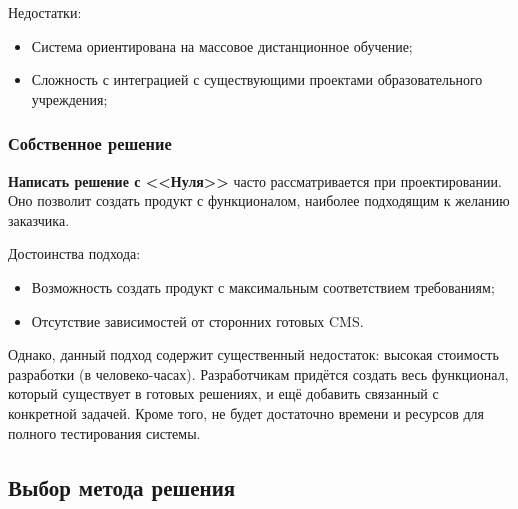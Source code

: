 \documentclass[a4paper,14pt]{article}
\begin{document}
Недостатки:

\begin{itemize}
	\item Система ориентирована на массовое дистанционное обучение;
	\item Сложность с интеграцией с существующими проектами образовательного учреждения;
\end{itemize}

\subsubsection{Собственное решение} 

\textbf{Написать решение с <<Нуля>>} часто рассматривается при проектировании.
Оно позволит создать продукт с функционалом, наиболее подходящим к желанию заказчика.

Достоинства подхода:

\begin{itemize}
	\item Возможность создать продукт с максимальным соответствием требованиям;
	\item Отсутствие зависимостей от сторонних готовых CMS.
\end{itemize}

Однако, данный подход содержит существенный недостаток: высокая стоимость разработки (в человеко-часах).
Разработчикам придётся создать весь функционал, который существует в готовых решениях,  и ещё добавить связанный с конкретной задачей.
Кроме того, не будет достаточно времени и ресурсов для полного тестирования системы.




\subsection{Выбор метода решения}
\end{document}
